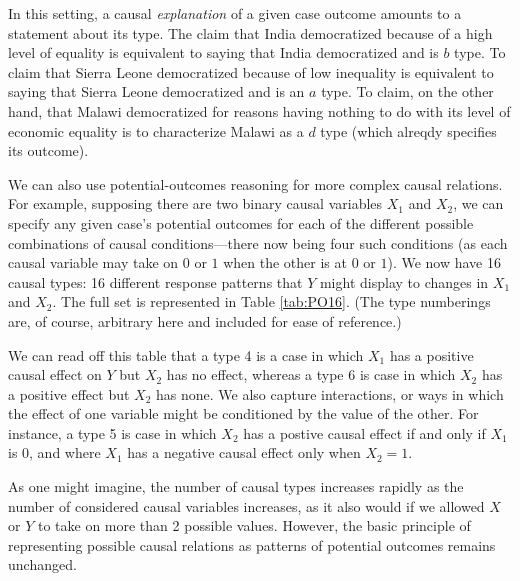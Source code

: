 \documentclass[12pt,]{book}
\begin{document}
In this setting, a causal \emph{explanation} of a given case outcome amounts to a statement about its type. The claim that India democratized because of a high level of equality is equivalent to saying that India democratized and is \(b\) type. To claim that Sierra Leone democratized because of low inequality is equivalent to saying that Sierra Leone democratized and is an \(a\) type. To claim, on the other hand, that Malawi democratized for reasons having nothing to do with its level of economic equality is to characterize Malawi as a \(d\) type (which alreqdy specifies its outcome).

We can also use potential-outcomes reasoning for more complex causal relations. For example, supposing there are two binary causal variables \(X_1\) and \(X_2\), we can specify any given case's potential outcomes for each of the different possible combinations of causal conditions---there now being four such conditions (as each causal variable may take on \(0\) or \(1\) when the other is at \(0\) or \(1\)). We now have 16 causal types: 16 different response patterns that \(Y\) might display to changes in \(X_1\) and \(X_2\). The full set is represented in Table \ref{tab:PO16}. (The type numberings are, of course, arbitrary here and included for ease of reference.)

We can read off this table that a type 4 is a case in which \(X_1\) has a positive causal effect on \(Y\) but \(X_2\) has no effect, whereas a type 6 is case in which \(X_2\) has a positive effect but \(X_2\) has none. We also capture interactions, or ways in which the effect of one variable might be conditioned by the value of the other. For instance, a type 5 is case in which \(X_2\) has a postive causal effect if and only if \(X_1\) is 0, and where \(X_1\) has a negative causal effect only when \(X_2=1\).

As one might imagine, the number of causal types increases rapidly as the number of considered causal variables increases, as it also would if we allowed \(X\) or \(Y\) to take on more than 2 possible values. However, the basic principle of representing possible causal relations as patterns of potential outcomes remains unchanged.
\end{document}
